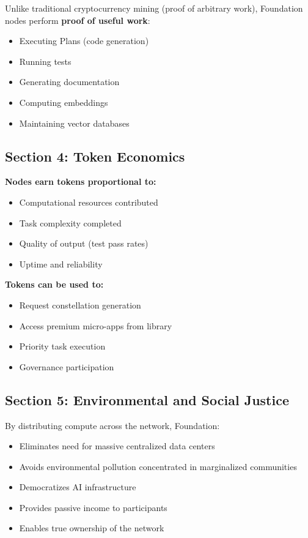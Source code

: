 \documentclass[12pt,letterpaper]{article}
\begin{document}
Unlike traditional cryptocurrency mining (proof of arbitrary work), Foundation nodes perform \textbf{proof of useful work}:

\begin{itemize}
    \item Executing Plans (code generation)
    \item Running tests
    \item Generating documentation
    \item Computing embeddings
    \item Maintaining vector databases
\end{itemize}

\subsection{Section 4: Token Economics}

\begin{tcolorbox}[colback=accentorange!10,colframe=accentorange,title=Economic Model]
\textbf{Nodes earn tokens proportional to:}
\begin{itemize}
    \item Computational resources contributed
    \item Task complexity completed
    \item Quality of output (test pass rates)
    \item Uptime and reliability
\end{itemize}

\textbf{Tokens can be used to:}
\begin{itemize}
    \item Request constellation generation
    \item Access premium micro-apps from library
    \item Priority task execution
    \item Governance participation
\end{itemize}
\end{tcolorbox}

\subsection{Section 5: Environmental and Social Justice}

By distributing compute across the network, Foundation:

\begin{itemize}
    \item Eliminates need for massive centralized data centers
    \item Avoids environmental pollution concentrated in marginalized communities
    \item Democratizes AI infrastructure
    \item Provides passive income to participants
    \item Enables true ownership of the network
\end{itemize}
\end{document}
